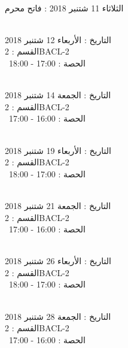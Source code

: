 \documentclass[14pt a4paper twocolumn]{book}
\begin{document}
\par
\noindent\makebox[\linewidth]{\rule{\paperwidth}{0.4pt}}
 \\
الثلاثاء 11 شتنبر 2018 :   فاتح محرم
\par
\noindent\makebox[\linewidth]{\rule{\paperwidth}{0.4pt}}
 \\
التاريخ : الأربعاء 12 شتنبر 2018 \\
القسم : 2BACL-2 \\
 \  
الحصة : 17:00 - 18:00 \\
\par
\noindent\makebox[\linewidth]{\rule{\paperwidth}{0.4pt}}
 \\
التاريخ : الجمعة 14 شتنبر 2018 \\
القسم : 2BACL-2 \\
 \  
الحصة : 16:00 - 17:00 \\
\par
\noindent\makebox[\linewidth]{\rule{\paperwidth}{0.4pt}}
 \\
التاريخ : الأربعاء 19 شتنبر 2018 \\
القسم : 2BACL-2 \\
 \  
الحصة : 17:00 - 18:00 \\
\par
\noindent\makebox[\linewidth]{\rule{\paperwidth}{0.4pt}}
 \\
التاريخ : الجمعة 21 شتنبر 2018 \\
القسم : 2BACL-2 \\
 \  
الحصة : 16:00 - 17:00 \\
\par
\noindent\makebox[\linewidth]{\rule{\paperwidth}{0.4pt}}
 \\
التاريخ : الأربعاء 26 شتنبر 2018 \\
القسم : 2BACL-2 \\
 \  
الحصة : 17:00 - 18:00 \\
\par
\noindent\makebox[\linewidth]{\rule{\paperwidth}{0.4pt}}
 \\
التاريخ : الجمعة 28 شتنبر 2018 \\
القسم : 2BACL-2 \\
 \  
الحصة : 16:00 - 17:00 \\
\par
\end{document}
